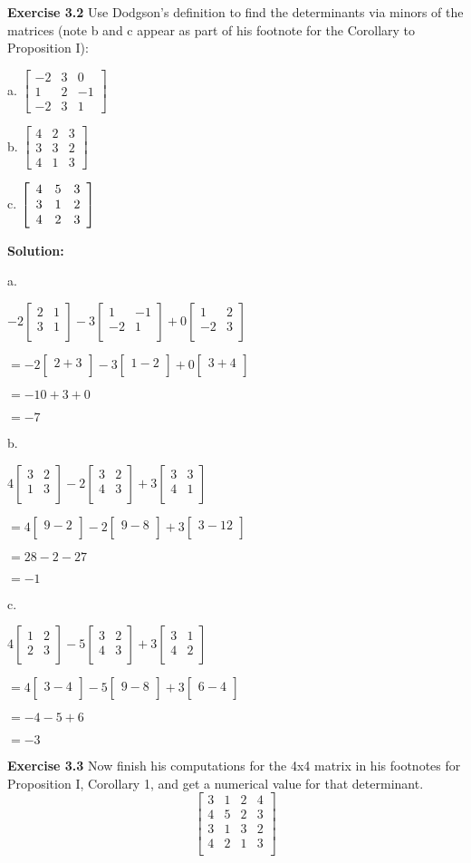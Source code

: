 \documentclass[12pt]{article}
\newcommand{\sol} {\textbf{Solution:}}
\newcommand{\matx}[1] {
\begin{bmatrix}
  #1 \\
\end{bmatrix}
}
\newcommand{\matxx}[2] {
\begin{bmatrix}
  #1 \\
  #2 \\
\end{bmatrix}
}
\newcommand{\matxxxx}[4] {
\begin{bmatrix}
  #1 \\
  #2 \\
  #3 \\
  #4 \\
\end{bmatrix}
}
\begin{document}
\pagebreak
\noindent\textbf{Exercise 3.2} Use Dodgson's definition to find the
determinants via minors of the matrices (note b and c appear as part of his
footnote for the Corollary to Proposition I):

a. $%
\begin{bmatrix}
-2 & 3 & 0\\
1 & 2 & -1\\
-2 & 3 & 1
\end{bmatrix}
$

b. $%
\begin{bmatrix}
4 & 2 & 3\\
3 & 3 & 2\\
4 & 1 & 3
\end{bmatrix}
$

c. $\left[
\begin{array}
[c]{ccc}%
4 & 5 & 3\\
3 & 1 & 2\\
4 & 2 & 3
\end{array}
\right]  $

\bigskip

\sol

a.

\(-2 \matxx{2 & 1}{3 & 1} -3 \matxx{1 & -1}{-2 & 1} + 0 \matxx{1 &2}{-2 &3}\)

\(=-2 \matx{2 + 3} -3 \matx{1 - 2} + 0\matx{3 + 4}\)

\(= -10 + 3 + 0\)

\(= -7 \)

\bigskip
b.

\(4 \matxx{3 & 2}{1 & 3} -2 \matxx{3 & 2}{4 & 3} + 3 \matxx{3 &3}{4 &1}\)

\(=4 \matx{9 - 2} -2 \matx{9 - 8} + 3\matx{3 - 12}\)

\(= 28 - 2 - 27\)

\(= -1 \)

\bigskip
c.

\(4 \matxx{1 & 2}{2 & 3} -5 \matxx{3 & 2}{4 & 3} + 3 \matxx{3 &1}{4 &2}\)

\(=4 \matx{3 - 4} -5 \matx{9 - 8} + 3\matx{6 - 4}\)

\(= -4 - 5 + 6\)

\(= -3 \)


\pagebreak
\noindent\textbf{Exercise 3.3} Now finish his computations for the 4x4 matrix
in his footnotes for Proposition I, Corollary 1, and get a numerical value for
that determinant.
\[
\matxxxx{3&1&2&4}
		{4&5&2&3}
       	{3&1&3&2}
        {4&2&1&3}
\]


\bigskip
\end{document}
